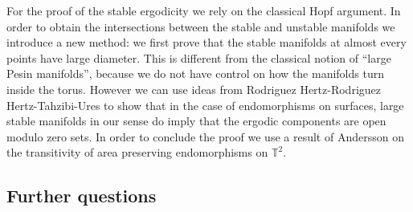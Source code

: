 \documentclass[11pt,letterpaper,reqno]{article}
\newcommand{\TT}{\mathbb{T}^2}
\begin{document}
For the proof of the stable ergodicity we rely on the classical Hopf argument. In order to obtain the intersections between the stable and unstable manifolds we introduce a new method: we first prove that the stable manifolds at almost every points have large diameter. This is different from the classical notion of ``large Pesin manifolds'', because we do not have control on how the manifolds turn inside the torus. However we can use ideas from Rodriguez Hertz-Rodriguez Hertz-Tahzibi-Ures \cite{Hertz2011} to show that in the case of endomorphisms on surfaces, large stable manifolds in our sense do imply that the ergodic components are open modulo zero sets. In order to conclude the proof we use a result of Andersson \cite{Andersson2016} on the transitivity of area preserving endomorphisms on $\TT$.


\subsection{Further questions}\label{subs:furtherQ}
\end{document}
